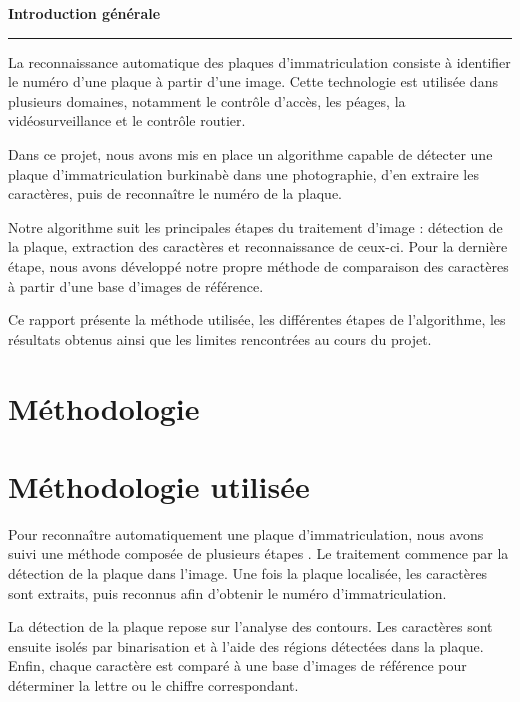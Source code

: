 \documentclass[11pt,a4paper]{article}
\newcommand{\titrecentre}[1]{%
  \begingroup
  \centering\normalfont\huge\bfseries\sffamily#1\par
  \endgroup
  \begin{center}\vspace{4pt}\rule{4cm}{0.8pt}\end{center}
  \vspace{16pt}
}
\begin{document}
\listoftables
\vspace{8pt}
\listoffigures
\newpage


\titrecentre{Introduction générale}
\label{pg:intro}

La reconnaissance automatique des plaques d'immatriculation consiste à identifier le numéro d'une plaque à partir d'une image. Cette technologie est utilisée dans plusieurs domaines, notamment le contrôle d'accès, les péages, la vidéosurveillance et le contrôle routier.

Dans ce projet, nous avons mis en place un algorithme capable de détecter une plaque d'immatriculation burkinabè dans une photographie, d'en extraire les caractères, puis de reconnaître le numéro de la plaque. 

Notre algorithme suit les principales étapes du traitement d'image : détection de la plaque, extraction des caractères et reconnaissance de ceux-ci. Pour la dernière étape, nous avons développé notre propre méthode de comparaison des caractères à partir d'une base d'images de référence.

Ce rapport présente la méthode utilisée, les différentes étapes de l'algorithme, les résultats obtenus ainsi que les limites rencontrées au cours du projet.
\clearpage
\section{Méthodologie}
\label{pg:I}

\section{Méthodologie utilisée}
\label{pg:I0}

Pour reconnaître automatiquement une plaque d'immatriculation, nous avons suivi une méthode composée de plusieurs étapes \cite{ref1,ref2,ref_blida}. Le traitement commence par la détection de la plaque dans l'image. Une fois la plaque localisée, les caractères sont extraits, puis reconnus afin d'obtenir le numéro d'immatriculation.

La détection de la plaque repose sur l'analyse des contours. Les caractères sont ensuite isolés par binarisation et à l'aide des régions détectées dans la plaque. Enfin, chaque caractère est comparé à une base d'images de référence pour déterminer la lettre ou le chiffre correspondant.
\end{document}
